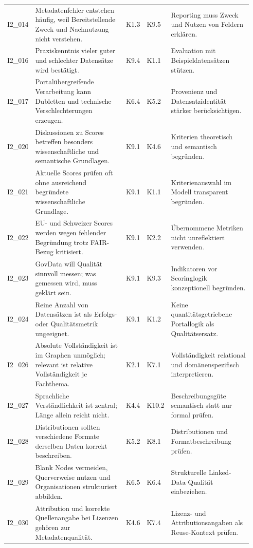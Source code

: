 \begin{longtable}{p{0.9cm} p{6cm} p{0.9cm} p{0.9cm} p{6cm}}
I2\_014 & Metadatenfehler entstehen häufig, weil Bereitstellende Zweck und Nachnutzung nicht verstehen. & K1.3 & K9.5 & Reporting muss Zweck und Nutzen von Feldern erklären. \\
I2\_016 & Praxiskenntnis vieler guter und schlechter Datensätze wird bestätigt. & K9.4 & K1.1 & Evaluation mit Beispieldatensätzen stützen. \\
I2\_017 & Portalübergreifende Verarbeitung kann Dubletten und technische Verschlechterungen erzeugen. & K6.4 & K5.2 & Provenienz und Datensatzidentität stärker berücksichtigen. \\
I2\_020 & Diskussionen zu Scores betreffen besonders wissenschaftliche und semantische Grundlagen. & K9.1 & K4.6 & Kriterien theoretisch und semantisch begründen. \\
I2\_021 & Aktuelle Scores prüfen oft ohne ausreichend begründete wissenschaftliche Grundlage. & K9.1 & K1.1 & Kriterienauswahl im Modell transparent begründen. \\
I2\_022 & EU- und Schweizer Scores werden wegen fehlender Begründung trotz FAIR-Bezug kritisiert. & K9.1 & K2.2 & Übernommene Metriken nicht unreflektiert verwenden. \\
I2\_023 & GovData will Qualität sinnvoll messen; was gemessen wird, muss geklärt sein. & K9.1 & K9.3 & Indikatoren vor Scoringlogik konzeptionell begründen. \\
I2\_024 & Reine Anzahl von Datensätzen ist als Erfolgs- oder Qualitätsmetrik ungeeignet. & K9.1 & K1.2 & Keine quantitätsgetriebene Portallogik als Qualitätsersatz. \\
I2\_026 & Absolute Vollständigkeit ist im Graphen unmöglich; relevant ist relative Vollständigkeit je Fachthema. & K2.1 & K7.1 & Vollständigkeit relational und domänenspezifisch interpretieren. \\
I2\_027 & Sprachliche Verständlichkeit ist zentral; Länge allein reicht nicht. & K4.4 & K10.2 & Beschreibungsgüte semantisch statt nur formal prüfen. \\
I2\_028 & Distributionen sollten verschiedene Formate derselben Daten korrekt beschreiben. & K5.2 & K8.1 & Distributionen und Formatbeschreibung prüfen. \\
I2\_029 & Blank Nodes vermeiden, Querverweise nutzen und Organisationen strukturiert abbilden. & K6.5 & K6.4 & Strukturelle Linked-Data-Qualität einbeziehen. \\
I2\_030 & Attribution und korrekte Quellenangabe bei Lizenzen gehören zur Metadatenqualität. & K4.6 & K7.4 & Lizenz- und Attributionsangaben als Reuse-Kontext prüfen. \\

\end{longtable}

